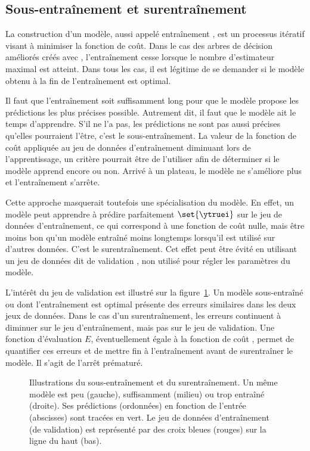 \subsection{Sous-entraînement et surentraînement}
La construction d'un modèle, aussi appelé \og entraînement \fg,
est un processus itératif
visant à minimiser la fonction de coût.
Dans le cas des arbres de décision améliorés créés avec \XGBOOST,
l'entraînement cesse lorsque le nombre d'estimateur maximal est atteint. %
Dans tous les cas, il est légitime de se demander si le modèle obtenu à la fin de l'entraînement est optimal.
\par
Il faut que l'entraînement soit suffisamment long pour que le modèle propose les prédictions les plus précises possible.
Autrement dit, il faut que le modèle ait le temps d'apprendre.
S'il ne l'a pas, les prédictions ne sont pas aussi précises qu'elles pourraient l'être, c'est le sous-entraînement.
La valeur de la fonction de coût appliquée au jeu de données d'entraînement diminuant lors de l'apprentissage,
un critère pourrait être de l'utiliser afin de déterminer si le modèle apprend encore ou non.
Arrivé à un plateau, le modèle ne s'améliore plus et l'entraînement s'arrête.
\par
Cette approche masquerait toutefois une spécialisation du modèle.
En effet, un modèle peut apprendre à prédire parfaitement $\set{\ytruei}$ sur le jeu de données d'entraînement,
ce qui correspond à une fonction de coût nulle,
mais être moins bon qu'un modèle entraîné moins longtemps lorsqu'il est utilisé sur d'autres données.
C'est le surentraînement.
Cet effet peut être évité en utilisant un jeu de données dit de \og validation \fg,
non utilisé pour régler les paramètres du modèle.
\par
L'intérêt du jeu de validation est illustré sur la figure~\ref{fig-underfitting_and_overfitting}.
Un modèle sous-entraîné ou dont l'entraînement est optimal présente des erreurs similaires dans les deux jeux de données.
Dans le cas d'un surentraînement, les erreurs continuent à diminuer sur le jeu d'entraînement, mais pas sur le jeu de validation.
Une fonction d'évaluation $E$, éventuellement égale à la fonction de coût \Loss, permet de quantifier ces erreurs et de mettre fin à l'entraînement avant de surentraîner le modèle.
Il s'agit de l'arrêt prématuré.
\begin{figure}[h]
\centering

\caption[Illustrations du sous-entraînement et du surentraînement.]{Illustrations du sous-entraînement et du surentraînement.
Un même modèle est peu (gauche), suffisamment (milieu) ou trop entraîné (droite). Ses prédictions (ordonnées) en fonction de l'entrée (abscisses) sont tracées en vert.
Le jeu de données d'entraînement (de validation) est représenté par des croix bleues (rouges) sur la ligne du haut (bas).}
\label{fig-underfitting_and_overfitting}
\end{figure}
